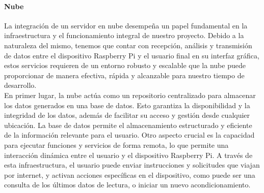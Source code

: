 \paragraph{Nube}
La integración de un servidor en nube desempeña un papel fundamental en la infraestructura y el funcionamiento integral de nuestro proyecto. Debido a la naturaleza del mismo, tenemos que contar con recepción, análisis y transmisión de datos entre el dispositivo Raspberry Pi y el usuario final en su interfaz gráfica, estos servicios requieren de un entorno robusto y escalable que la nube puede proporcionar de manera efectiva, rápida y alcanzable para nuestro tiempo de desarrollo. \\

En primer lugar, la nube actúa como un repositorio centralizado para almacenar los datos generados en una base de datos. Esto garantiza la disponibilidad y la integridad de los datos, además de facilitar su acceso y gestión desde cualquier ubicación. La base de datos permite el almacenamiento estructurado y eficiente de la información relevante para el usuario. Otro aspecto crucial es la capacidad para ejecutar funciones y servicios de forma remota, lo que permite una interacción dinámica entre el usuario y el dispositivo Raspberry Pi. A través de esta infraestructura, el usuario puede enviar instrucciones y solicitudes que viajan por internet, y activan acciones específicas en el dispositivo, como puede ser una consulta de los últimos datos de lectura, o iniciar un nuevo acondicionamiento. \\

